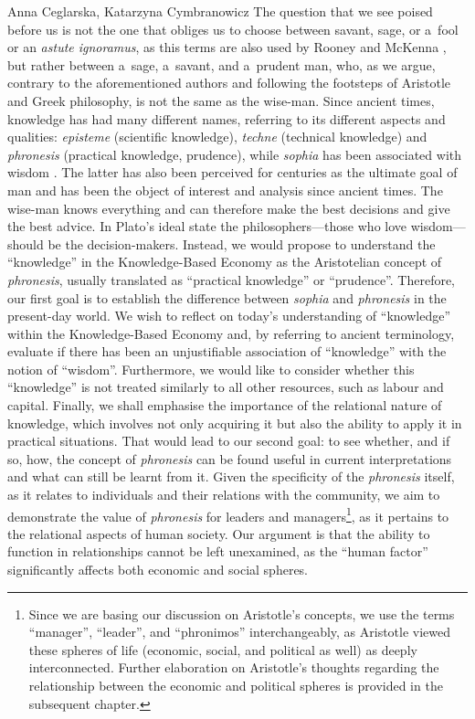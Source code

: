 \begin{artengenv2auth}{Anna Ceglarska, Katarzyna Cymbranowicz}
The question that we see poised before us is not the one that obliges us to choose between savant, sage, or a~fool or an \textit{astute ignoramus}, as this terms are also used by Rooney and McKenna 
\parencite*[][p.315]{rooney_should_2005}, %
 but rather between a~sage, a~savant, and a~prudent man, who, as we argue, contrary to the aforementioned authors and following the footsteps of Aristotle and Greek philosophy, is not the same as the wise-man. Since ancient times, knowledge has had many different names, referring to its different aspects and qualities: \textit{episteme} (scientific knowledge), \textit{techne} (technical knowledge) and \textit{phronesis} (practical knowledge, prudence), while \textit{sophia} has been associated with wisdom 
\parencite[][]{rackham_nicomachean_1934}. %
 The latter has also been perceived for centuries as the ultimate goal of man and has been the object of interest and analysis since ancient times. The wise-man knows everything and can therefore make the best decisions and give the best advice. In Plato's ideal state the philosophers---those who love wisdom---should be the decision-makers. Instead, we would propose to understand the ``knowledge'' in the Knowledge-Based Economy as the Aristotelian concept of \textit{phronesis}, usually translated as ``practical knowledge'' or ``prudence''. Therefore, our first goal is to establish the difference between \textit{sophia} and \textit{phronesis} in the present-day world. We wish to reflect on today's understanding of ``knowledge'' within the Knowledge-Based Economy and, by referring to ancient terminology, evaluate if there has been an unjustifiable association of ``knowledge'' with the notion of ``wisdom''. Furthermore, we would like to consider whether this ``knowledge'' is not treated similarly to all other resources, such as labour and capital. Finally, we shall emphasise the importance of the relational nature of knowledge, which involves not only acquiring it but also the ability to apply it in practical situations. That would lead to our second goal: to see whether, and if so, how, the concept of \textit{phronesis} can be found useful in current interpretations and what can still be learnt from it. Given the specificity of the \textit{phronesis} itself, as it relates to individuals and their relations with the community, we aim to demonstrate the value of \textit{phronesis} for leaders and managers\footnote{Since we are basing our discussion on Aristotle's concepts, we use the terms ``manager'', ``leader'', and ``phronimos'' interchangeably, as Aristotle viewed these spheres of life (economic, social, and political as well) as deeply interconnected. Further elaboration on Aristotle's thoughts regarding the relationship between the economic and political spheres is provided in the subsequent chapter.}, as it pertains to the relational aspects of human society. Our argument is that the ability to function in relationships cannot be left unexamined, as the ``human factor'' significantly affects both economic and social spheres.




\end{artengenv2auth}
